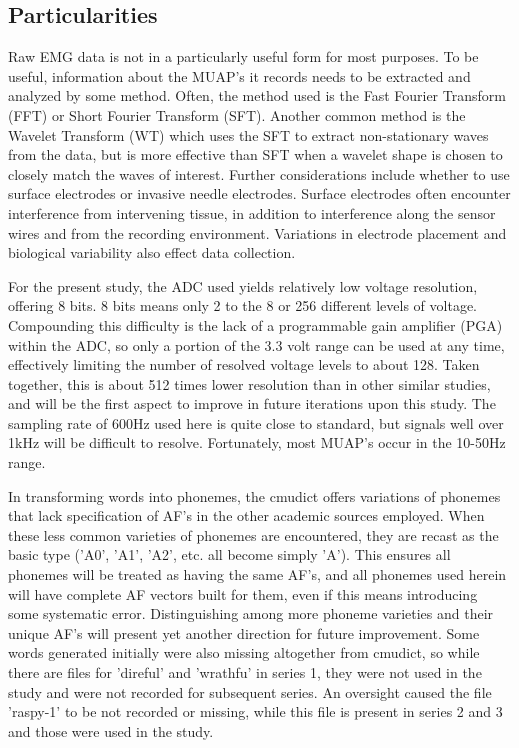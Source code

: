 \documentclass[conference]{IEEEtran}
\begin{document}
\subsection{Particularities}
Raw EMG data is not in a particularly useful form for most purposes. To be useful, information about the MUAP's it records needs to be extracted and analyzed by some method. Often, the method used is the Fast Fourier Transform (FFT) or Short Fourier Transform (SFT). Another common method is the Wavelet Transform (WT) which uses the SFT to extract non-stationary waves from the data, but is more effective than SFT when a wavelet shape is chosen to closely match the waves of interest. Further considerations include whether to use surface electrodes or invasive needle electrodes. Surface electrodes often encounter interference from intervening tissue, in addition to interference along the sensor wires and from the recording environment. Variations in electrode placement and biological variability also effect data collection.

For the present study, the ADC used yields relatively low voltage resolution, offering 8 bits. 8 bits means only 2 to the 8 or 256 different levels of voltage. Compounding this difficulty is the lack of a programmable gain amplifier (PGA) within the ADC, so only a portion of the 3.3 volt range can be used at any time, effectively limiting the number of resolved voltage levels to about 128. Taken together, this is about 512 times lower resolution than in other similar studies, and will be the first aspect to improve in future iterations upon this study. The sampling rate of 600Hz used here is quite close to standard, but signals well over 1kHz will be difficult to resolve. Fortunately, most MUAP's occur in the 10-50Hz range.

In transforming words into phonemes, the cmudict offers variations of phonemes that lack specification of AF's in the other academic sources employed. When these less common varieties of phonemes are encountered, they are recast as the basic type ('A0', 'A1', 'A2', etc. all become simply 'A'). This ensures all phonemes will be treated as having the same AF's, and all phonemes used herein will have complete AF vectors built for them, even if this means introducing some systematic error. Distinguishing among more phoneme varieties and their unique AF's will present yet another direction for future improvement. Some words generated initially were also missing altogether from cmudict, so while there are files for 'direful' and 'wrathfu' in series 1, they were not used in the study and were not recorded for subsequent series. An oversight caused the file 'raspy-1' to be not recorded or missing, while this file is present in series 2 and 3 and those were used in the study.
\end{document}
